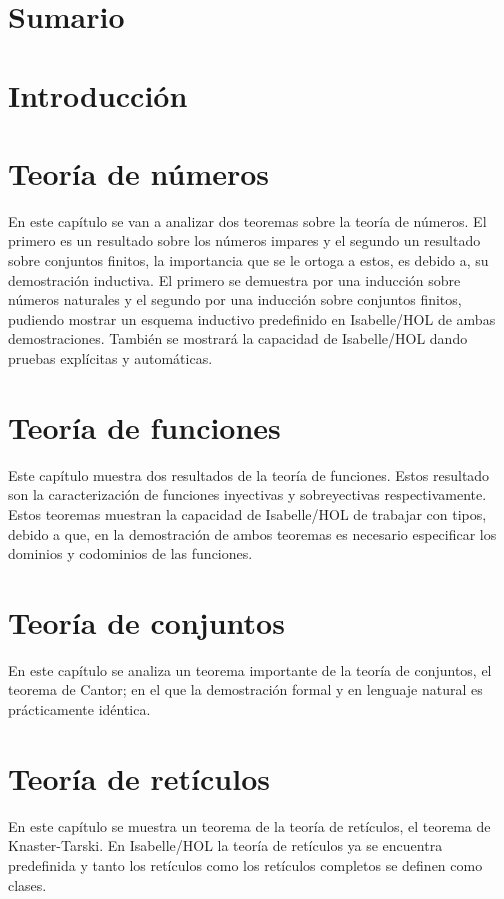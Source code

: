 \documentclass[12pt,a4paper,twoside]{book}
\begin{document}
\chapter*{Sumario}

\chapter*{Introducción}

\chapter{Teoría de números}
En este capítulo se van a analizar dos teoremas sobre la teoría de
números. El primero es un resultado sobre los números impares y el
 segundo un resultado sobre conjuntos finitos, la importancia que se le
 ortoga a estos, es debido a, su demostración inductiva. El primero se
 demuestra por una inducción sobre números naturales y el segundo por
 una inducción sobre conjuntos finitos, pudiendo mostrar un esquema
 inductivo predefinido en Isabelle/HOL de ambas demostraciones. También
 se mostrará la capacidad de Isabelle/HOL dando pruebas explícitas y
 automáticas.


\chapter{Teoría de funciones}
Este capítulo muestra dos resultados de la teoría de funciones. Estos
resultado son la caracterización de funciones inyectivas y sobreyectivas 
respectivamente. Estos teoremas muestran la capacidad de Isabelle/HOL de 
trabajar con tipos, debido a que, en la demostración de ambos teoremas 
es necesario especificar los dominios y codominios de las funciones.


\chapter{Teoría de conjuntos}
En este capítulo se analiza un teorema importante de la teoría de conjuntos,
el teorema de Cantor; en el que la demostración formal y en lenguaje natural
es prácticamente idéntica. 

\chapter{Teoría de retículos}
En este capítulo se muestra un teorema de la teoría de retículos, el teorema de
Knaster-Tarski. En Isabelle/HOL la teoría de retículos ya se encuentra predefinida
y tanto los retículos como los retículos completos se definen como clases. 

\end{document}
